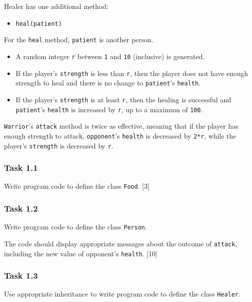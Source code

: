 Healer has one additional method:
\begin{itemize}
\item \texttt{heal(patient)}
\end{itemize}
\quad{}

For the \texttt{heal} method, \texttt{patient} is another person.
\begin{itemize}
\item A random integer \texttt{r} between \texttt{1} and \texttt{10} (inclusive)
is generated. 
\item If the player\textquoteright s \texttt{strength} is less than \texttt{r},
then the player does not have enough strength to heal and there is
no change to \texttt{patient}\textquoteright s \texttt{health}. 
\item If the player\textquoteright s \texttt{strength} is at least \texttt{r},
then the healing is successful and \texttt{patient}\textquoteright s
\texttt{health} is increased by \texttt{r}, up to a maximum of \texttt{100}.
\end{itemize}
\texttt{Warrior}\textquoteright s \texttt{attack} method is twice
as effective, meaning that if the player has enough strength to attack,
\texttt{opponent}\textquoteright s \texttt{health} is decreased by
\texttt{2{*}r}, while the player\textquoteright s \texttt{strength}
is decreased by \texttt{r}.

\subsubsection*{Task 1.1}

Write program code to define the class \texttt{Food}. \hfill{}{[}3{]}

\subsubsection*{Task 1.2}

Write program code to define the class \texttt{Person}.

The code should display appropriate messages about the outcome of
\texttt{attack}, including the new value of opponent\textquoteright s
\texttt{health}. \hfill{}{[}10{]}

\subsubsection*{Task 1.3}

Use appropriate inheritance to write program code to define the class
\texttt{Healer}.

